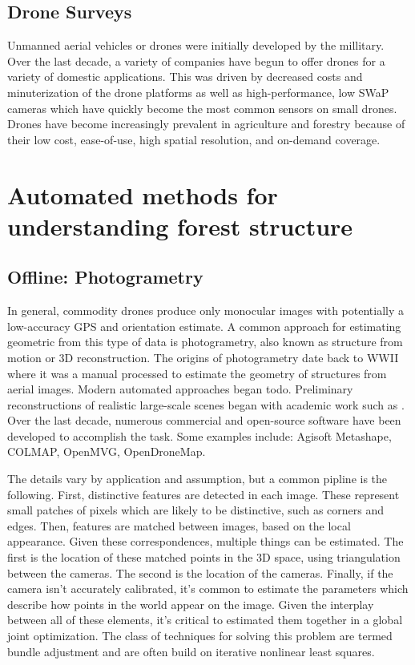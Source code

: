 \subsection{Drone Surveys}
Unmanned aerial vehicles or drones were initially developed by the millitary. Over the last decade, a variety of companies have begun to offer drones for a variety of domestic applications. This was driven by decreased costs and minuterization of the drone platforms as well as high-performance, low SWaP cameras which have quickly become the most common sensors on small drones. Drones have become increasingly prevalent in agriculture and forestry because of their low cost, ease-of-use, high spatial resolution, and on-demand coverage. 

\section{Automated methods for understanding forest structure}
\subsection{Offline: Photogrametry}
In general, commodity drones produce only monocular images with potentially a low-accuracy GPS and orientation estimate. A common approach for estimating geometric from this type of data is photogrametry, also known as structure from motion or 3D reconstruction. The origins of photogrametry date back to WWII where it was a manual processed to estimate the geometry of structures from aerial images. Modern automated approaches began todo. Preliminary reconstructions of realistic large-scale scenes began with academic work such as \cite{Agarwal2009}. Over the last decade, numerous commercial and open-source software have been developed to accomplish the task. Some examples include: Agisoft Metashape, COLMAP, OpenMVG, OpenDroneMap.

The details vary by application and assumption, but a common pipline is the following. First, distinctive features are detected in each image. These represent small patches of pixels which are likely to be distinctive, such as corners and edges. Then, features are matched between images, based on the local appearance. 
Given these correspondences, multiple things can be estimated. The first is the location of these matched points in the 3D space, using triangulation between the cameras. The second is the location of the cameras. Finally, if the camera isn't accurately calibrated, it's common to estimate the parameters which describe how points in the world appear on the image. Given the interplay between all of these elements, it's critical to estimated them together in a global joint optimization. The class of techniques for solving this problem are termed bundle adjustment and are often build on iterative nonlinear least squares. 


